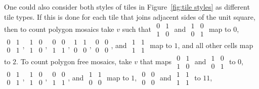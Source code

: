 \documentclass[12pt]{article}
\theoremstyle{plain}
\theoremstyle{remark}
\theoremstyle{definition}
\theoremstyle{remark}
\theoremstyle{definition}
\begin{document}
One could also consider both styles of tiles in Figure~\ref{fig:tile styles} as different tile types. If this is done for each tile that joins adjacent sides of the unit square, then to count polygon mosaics take $v$ such that $\begin{smallmatrix} 0 & 1 \\ 1 & 0 \end{smallmatrix}$ and $\begin{smallmatrix} 1 & 0 \\ 0 & 1 \end{smallmatrix}$ map to $0$, $\begin{smallmatrix} 0 & 1 \\ 0 & 1 \end{smallmatrix}$, $\begin{smallmatrix} 1 & 0 \\ 1 & 0 \end{smallmatrix}$, $\begin{smallmatrix} 0 & 0 \\ 1 & 1 \end{smallmatrix}, \begin{smallmatrix} 1 & 1 \\ 0 & 0 \end{smallmatrix}, \begin{smallmatrix} 0 & 0 \\ 0 & 0 \end{smallmatrix}$, and $\begin{smallmatrix} 1 & 1 \\ 1 & 1 \end{smallmatrix}$ map to $1$, and all other cells map to $2$. To count polygon free mosaics, take $v$ that maps $\begin{smallmatrix} 0 & 1 \\ 1 & 0 \end{smallmatrix}$ and $\begin{smallmatrix} 1 & 0 \\ 0 & 1 \end{smallmatrix}$ to $0$, $\begin{smallmatrix} 0 & 1 \\ 0 & 1 \end{smallmatrix}$, $\begin{smallmatrix} 1 & 0 \\ 1 & 0 \end{smallmatrix}$, $\begin{smallmatrix} 0 & 0 \\ 1 & 1 \end{smallmatrix}$, and $\begin{smallmatrix} 1 & 1 \\ 0 & 0 \end{smallmatrix}$ map to $1$, $\begin{smallmatrix}0&0\\ 0&0\end{smallmatrix}$ and $\begin{smallmatrix}1&1\\ 1&1\end{smallmatrix}$ to $11$, 
\end{document}
